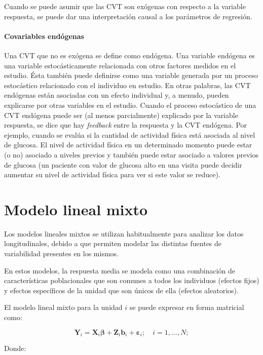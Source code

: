 \documentclass[spanish]{article}
\numberwithin{figure}{subsection}
\numberwithin{equation}{subsection}
\numberwithin{table}{subsection}
\begin{document}
Cuando se puede asumir que las CVT son exógenas con respecto a la variable
respuesta, se puede dar una interpretación causal a los parámetros de regresión.

\paragraph{Covariables endógenas} \mbox{}

Una CVT que no es exógena se define como endógena. Una variable endógena es una
variable estocásticamente relacionada con otros factores medidos en el estudio.
Ésta también puede definirse como una variable generada por un proceso
estocástico relacionado con el individuo en estudio. En otras palabras, las CVT
endógenas están asociadas con un efecto individual y, a menudo, pueden
explicarse por otras variables en el estudio. Cuando el proceso estocástico de
una CVT endógena puede ser (al menos parcialmente) explicado por la variable
respuesta, se dice que hay \textit{feedback} entre la respuesta y la CVT
endógena. Por ejemplo, cuando se evalúa si la cantidad de actividad física está
asociada al nivel de glucosa. El nivel de actividad física en un determinado
momento puede estar (o no) asociado a niveles previos y también puede estar
asociado a valores previos de glucosa (un paciente con valor de glucosa alto
en una visita puede decidir aumentar su nivel de actividad física para ver si
este valor se reduce).

\section{Modelo lineal mixto}

Los modelos lineales mixtos se utilizan habitualmente para analizar los datos
longitudinales, debido a que permiten modelar las distintas fuentes de
variabilidad presentes en los mismos.

En estos modelos, la respuesta media se modela como una combinación de
características poblacionales que son comunes a todos los individuos (efectos
fijos) y efectos específicos de la unidad que son únicos de ella (efectos
aleatorios).

El modelo lineal mixto para la unidad $i$ se puede expresar en forma matricial
como:

\[
	\bm{Y}_i = \bm{X}_i\bm{\beta} + \bm{Z}_i\bm{b}_i + \bm{\varepsilon}_i;
	\quad i = 1, ..., N;
\]

Donde:
\end{document}

